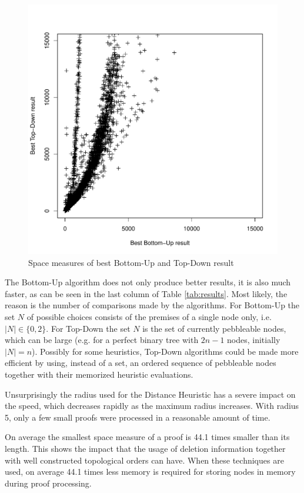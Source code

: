 
\begin{figure}
	\centering
	\includegraphics[scale=0.45]{figures/Fig7.pdf}
	\caption{Space measures of best Bottom-Up and Top-Down result}
	\label{fig:BUvsTD}
\end{figure}

The Bottom-Up algorithm does not only produce better results, it is also much faster, as can be seen in the last column of Table \ref{tab:results}. 
Most likely, the reason is the number of comparisons made by the algorithms. 
For Bottom-Up the set $N$ of possible choices consists of the premises of a single node only, i.e. $|N| \in \{0,2\}$.
For Top-Down the set $N$ is the set of currently pebbleable nodes, which can be large (e.g. for a perfect binary tree with $2n -1$ nodes, initially $|N| = n$). 
Possibly for some heuristics, Top-Down algorithms could be made more efficient by using, instead of a set, an ordered sequence of pebbleable nodes together with their memorized heuristic evaluations.

Unsurprisingly the radius used for the Distance Heuristic has a severe impact on the speed, which decreases rapidly as the maximum radius increases. 
With radius 5, only a few small proofs were processed in a reasonable amount of time.

On average the smallest space measure of a proof is 44.1 times smaller than its length. 
This shows the impact that the usage of deletion information together with well constructed topological orders can have. 
When these techniques are used, on average 44.1 times less memory is required for storing nodes in memory during proof processing.

